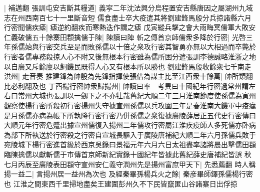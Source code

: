 |{
	補邁翻}
張訓屯安吉斷其糧道|{
	義寜二年沈法興分烏程置安吉縣唐因之屬湖州九域志在州西南百七十一里斷音短}
儒食盡士卒大疫遣其將劉建鋒馬殷分兵掠諸縣六月行密聞儒疾瘧|{
	瘧逆約翻疾而寒熱迭作謂之瘧}
戊寅縱兵擊之會大雨晦冥儒軍大敗安仁義破儒五十餘寨田頵擒儒于陳|{
	陳讀曰陣}
斬之傳首京師儒衆多降於行密|{
	光啓三年孫儒始與行密交兵至是而敗孫儒以十倍之衆攻行密其智勇亦無以大相過而卒斃於行密者儒專務殺掠人心不附又後無根本行密雖為儒所困分遣張訓李德誠略淮浙之地以自廣又斥餘廩以飼饑民既得人心又有根本所以勝也}
劉建鋒馬殷收餘衆七千南走洪州|{
	走音奏}
推建鋒為帥殷為先鋒指揮使張佶為謀主比至江西衆十餘萬|{
	帥所類翻比必利翻及也}
丁酉楊行密帥衆歸揚州|{
	帥讀曰率　考異曰十國紀年行密過常州謂左右曰常州大城也張訓以一劔下之不亦牡哉舊紀大順二年三月淮南節度使孫儒為寅州觀察使楊行密所殺初行密揚州失守據宣州孫儒以兵攻圍三年是春淮南大饑軍中疫癘是月孫儒亦病為帳下所執降行密行密乃併孫儒之衆復據廣陵薛居正五代史行密傳曰大順元年行密危蹙出據宣州儒復入揚州二年儒攻行密屬江淮疾疫師人多死儒亦卧病為部下所執送於行密殺之行密自宣城長驅入于廣陵唐補紀大順二年六月孫儒兵敗于宛陵城下楊行密進首級於西京吳錄曰景福元年六月六日太祖盡率諸將晨出擊儒田頵臨陳擒儒以獻斬儒于市傳首京師新紀實錄十國紀年皆據此舊紀薛史唐補紀皆誤}
秋七月丙辰至廣陵表田頵守宣州安仁義守潤州先是揚州富庶甲天下|{
	先悉薦翻}
時人稱揚一益二|{
	言揚州居一益州為次也}
及經秦畢孫楊兵火之餘|{
	秦彦畢師鐸孫儒楊行密也}
江淮之間東西千里掃地盡矣王建圍彭州久不下民皆竄匿山谷諸寨日出俘掠

